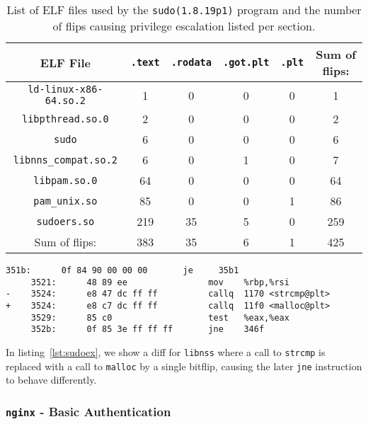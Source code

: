 \begin{table}[]
\begin{tabular}{c|cccc|c}
ELF File & \texttt{.text}  & \texttt{.rodata} & \texttt{.got.plt} &
\texttt{.plt} & Sum of flips:                             \\ \hline
\texttt{ld-linux-x86-64.so.2} & 1   & 0  & 0  & 0  & 1    \\
\texttt{libpthread.so.0}      & 2   & 0  & 0  & 0  & 2    \\
\texttt{sudo}                 & 6   & 0  & 0  & 0  & 6    \\
\texttt{libnns\_compat.so.2}  & 6   & 0  & 1  & 0  & 7    \\
\texttt{libpam.so.0}          & 64  & 0  & 0  & 0  & 64   \\
\texttt{pam\_unix.so}         & 85  & 0  & 0  & 1  & 86   \\
\texttt{sudoers.so}           & 219 & 35 & 5  & 0  & 259  \\ \hline
Sum of flips:                 & 383 & 35 & 6  & 1  & 425
\end{tabular}
\caption{List of ELF files used by the \texttt{sudo(1.8.19p1)} program and the
number of flips causing privilege escalation listed per section.}
\label{tab:sudores}
\end{table}

\begin{minipage}{\linewidth}
\begin{lstlisting}[style=diff,
                   caption={Diff for a bitflip applied to \texttt{libnss} in
order to bypass a user privilege check. The call to \texttt{strcmp} is
replaced because of the offset in the lookuptable being one off.},
label=lst:sudoex]
     351b:      0f 84 90 00 00 00       je     35b1
     3521:      48 89 ee                mov    %rbp,%rsi
-    3524:      e8 47 dc ff ff          callq  1170 <strcmp@plt>
+    3524:      e8 c7 dc ff ff          callq  11f0 <malloc@plt>
     3529:      85 c0                   test   %eax,%eax
     352b:      0f 85 3e ff ff ff       jne    346f
\end{lstlisting}
\end{minipage}

In listing~\ref{lst:sudoex}, we show a diff for \texttt{libnss} where a call to
\texttt{strcmp} is replaced with a call to \texttt{malloc} by a single bitflip,
causing the later \texttt{jne} instruction to behave differently.

\subsubsection{\texttt{nginx} - Basic Authentication}

